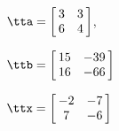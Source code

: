 {$\tta = \left[\hskip -3pt \begin{array}{cc} 3&3 \\    6&4 \end{array}\hskip -3pt \right] $, 

$\ttb=\left[\hskip -3pt \begin{array}{cc} 15&-39\\    16&-66  \end{array}\hskip -3pt \right] $}
{$\ttx=\left[\hskip -3pt \begin{array}{cc} -2&-7\\    7&-6  \end{array}\hskip -3pt \right] $}
